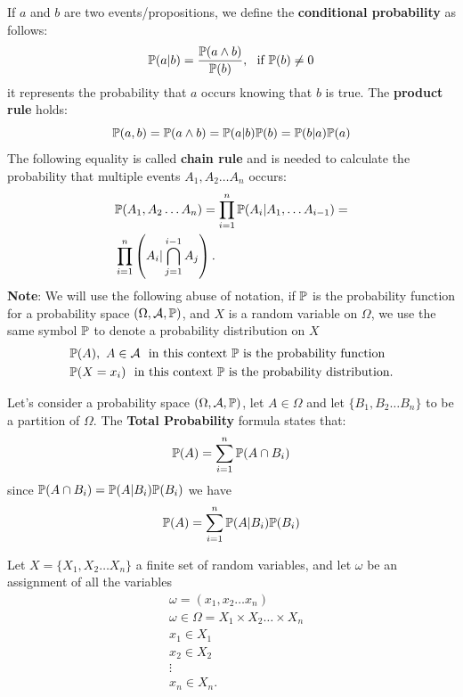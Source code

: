 \documentclass[10pt, letterpaper]{report}
\begin{document}
If $a$ and $b$ are two events/propositions, we define the \textbf{conditional probability} as follows:\begin{equation}
    \Prob(a|b)=\frac{\Prob(a\land b)}{\Prob(b)}, \ \ \text{if }\Prob(b)\ne0
\end{equation}
it represents the probability that $a$ occurs knowing that $b$ is true. The \textbf{product rule} holds:\begin{equation}
    {\mathbb P}(a,b)={\mathbb P}(a\land b)={\mathbb P}(a|b){\mathbb P}(b)={\mathbb P}(b|a){\mathbb P}(a)
\end{equation}
The following equality is called \textbf{chain rule} and is needed to calculate the probability that multiple events $A_1,A_2\dots A_n$ occurs:\begin{align}
    &{\mathbb P}(A_1,A_2\dots A_n)=\prod_{i=1}^n{\mathbb P}(A_i|A_1,\dots A_{i-1})=
    \\ &\prod_{i=1}^n\left( A_i|\bigcap_{j=1}^{i-1} A_j \right).
\end{align}
\textbf{Note}: We will use the following abuse of notation, if ${\mathbb P}$ is the probability function for a probability space $(\Omega,\mathcal A,{\mathbb P})$, and $X$ is a random variable on $\Omega$, we use the same symbol ${\mathbb P}$ to denote a probability distribution on $X$\begin{align}
    &{\mathbb P}(A), \ A\in\mathcal A \ \ \text{in this context ${\mathbb P}$ is the probability function}\\
    &{\mathbb P}(X=x_i) \ \ \text{in this context ${\mathbb P}$ is the probability distribution.}
\end{align}
\begin{theorem}
    Let's consider a probability space $(\Omega,\mathcal A, {\mathbb P})$, let $A\in \Omega$ and let $\{B_1,B_2\dots B_n\}$ to be a partition of $\Omega$. The \textbf{Total Probability} formula states that:\begin{equation}
        {\mathbb P}(A)=\sum_{i=1}^n{\mathbb P}(A\cap B_i)
    \end{equation}
    since ${\mathbb P}(A\cap B_i)={\mathbb P}(A|B_i){\mathbb P}(B_i)$ we have\begin{equation}
         {\mathbb P}(A)=\sum_{i=1}^n{\mathbb P}(A|B_i){\mathbb P}(B_i)
    \end{equation}
\end{theorem}
Let $X=\{X_1,X_2\dots X_n\}$ a finite set of random variables, and let $\omega$ be an assignment of all the variables\begin{align}
    &\omega=(x_1,x_2\dots x_n)\\
    &\omega\in\Omega=X_1\times X_2\dots \times X_n\\
    &x_1\in X_1\\ 
    &x_2\in X_2\\
    &\vdots \\ 
    &x_n\in X_n.
\end{align}
\end{document}
